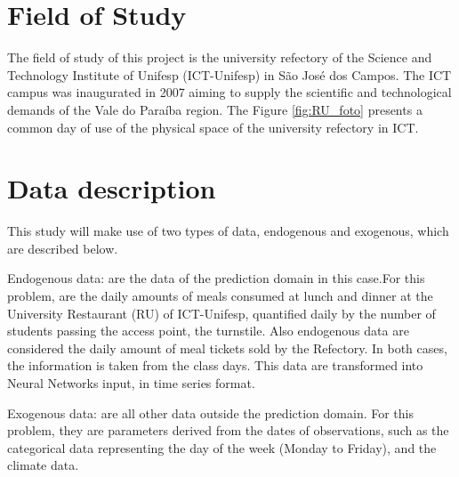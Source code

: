    \section{Field of Study}
       The field of study of this project is the university refectory of the Science and Technology Institute of Unifesp (ICT-Unifesp) in São José dos Campos. The ICT campus was inaugurated in 2007 aiming to supply the scientific and technological demands of the Vale do Paraíba region. The Figure \ref{fig:RU_foto} presents a common day of use of the physical space of the university refectory in ICT.
        
        \begin{figure}[H]
        \end{figure}
    
    \section{Data description}

    This study will make use of two types of data, endogenous and exogenous, which are described below. 
            
    Endogenous data:  are the data of the prediction domain in this case.For this problem, are the daily amounts of meals consumed at lunch and dinner at the University Restaurant (RU) of ICT-Unifesp, quantified daily by the number of students passing the access point, the turnstile.
   Also endogenous data are considered the daily amount of meal tickets sold by the Refectory. In both cases, the information is taken from the class days.  This data are transformed into Neural Networks input, in time series format.
            
    Exogenous data: are all other data outside the prediction domain. For this problem, they are parameters derived from the dates of observations, such as the categorical data representing the day of the week (Monday to Friday), and the climate data.
    
